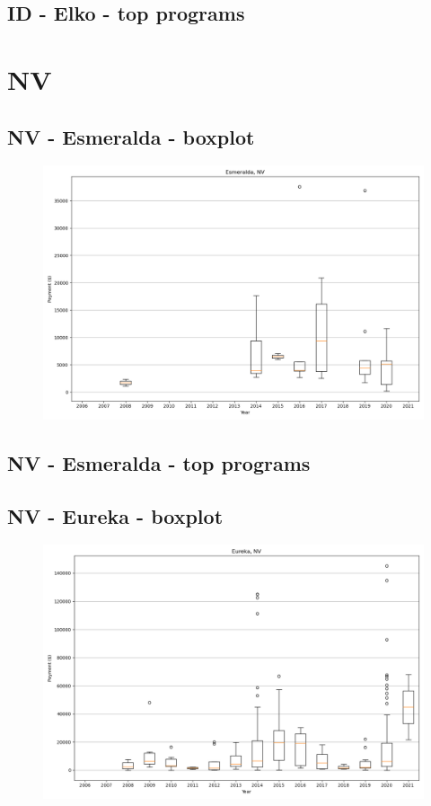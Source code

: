 \subsection*{ID - Elko - top programs}

\newpage
\section*{NV}
\subsection*{NV - Esmeralda - boxplot}
\begin{figure}[h]
\centering
\includegraphics[width=7in]{../output/boxplots/counties/Esmeralda-NV_boxplot.png}
\end{figure}


\subsection*{NV - Esmeralda - top programs}

\newpage
\subsection*{NV - Eureka - boxplot}
\begin{figure}[h]
\centering
\includegraphics[width=7in]{../output/boxplots/counties/Eureka-NV_boxplot.png}
\end{figure}


